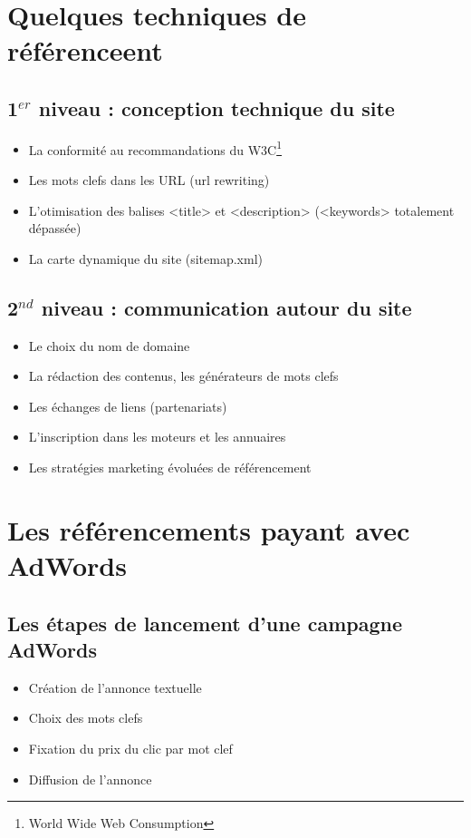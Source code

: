 \documentclass[12pt,a4paper,openany]{report}
\begin{document}
	\section{Quelques techniques de référenceent}
	\subsection{1$^{er}$ niveau : conception technique du site}
	\begin{itemize}
		\item La conformité au recommandations du W3C\footnote{World Wide Web Consumption}
		\item Les mots clefs dans les URL (url rewriting)
		\item L'otimisation des balises <title> et <description> (<keywords> totalement dépassée)
		\item La carte dynamique du site (sitemap.xml)
	\end{itemize}
	\subsection{2$^{nd}$ niveau : communication autour du site}
	\begin{itemize}
		\item Le choix du nom de domaine
		\item La rédaction des contenus, les générateurs de mots clefs
		\item Les échanges de liens (partenariats)
		\item L'inscription dans les moteurs et les annuaires
		\item Les stratégies marketing évoluées de référencement
	\end{itemize}
	\section{Les référencements payant avec AdWords}
	\subsection{Les étapes de lancement d'une campagne AdWords}
	\begin{itemize}
		\item Création de l'annonce textuelle
		\item Choix des mots clefs
		\item Fixation du prix du clic par mot clef
		\item Diffusion de l'annonce
	\end{itemize}
\end{document}
